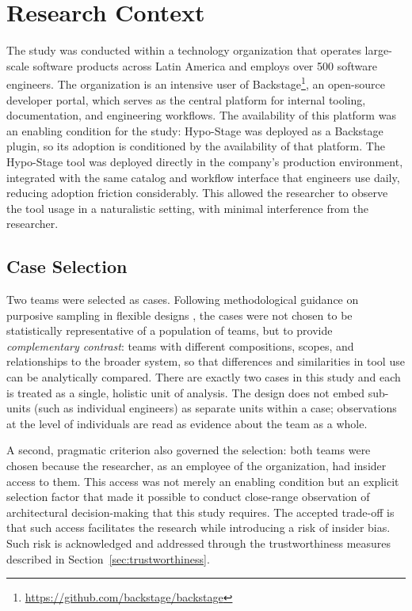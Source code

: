 \section{Research Context}
\label{sec:research-context}

The study was conducted within a technology organization that operates
large-scale software products across Latin America and employs over 500 software
engineers. The organization is an intensive user of Backstage\footnote{\url{https://github.com/backstage/backstage}}, an open-source
developer portal, which serves as the central platform for internal tooling,
documentation, and engineering workflows. The availability of this platform was an
enabling condition for the study: Hypo-Stage was deployed as a Backstage plugin, so its adoption is conditioned by the availability of that platform.
The Hypo-Stage tool was deployed directly in the company's production environment, integrated with the same catalog and workflow interface that engineers use daily, reducing adoption friction considerably. 
This allowed the researcher to observe the tool usage in a naturalistic setting, with minimal interference from the researcher.

\subsection{Case Selection}
\label{sec:case-selection}

Two teams were selected as cases. Following methodological guidance on purposive sampling in flexible designs \citep{robson2016}, the cases were not chosen
to be statistically representative of a population of teams, but to provide
\emph{complementary contrast}: teams with different compositions, scopes, and
relationships to the broader system, so that differences and similarities in tool use
can be analytically compared. There are exactly two cases in this study and each is treated as a single, holistic unit of analysis. The design
does not embed sub-units (such as individual engineers) as separate units within a
case; observations at the level of individuals are read as evidence about the team as
a whole.

A second, pragmatic criterion also governed the selection: both teams were chosen
because the researcher, as an employee of the organization, had insider access to
them. This access was not merely an enabling condition but an explicit
selection factor that made it possible to conduct close-range observation of architectural decision-making that this study requires.
The accepted trade-off is that such access facilitates the research while introducing a risk of insider bias. Such risk is acknowledged and addressed
through the trustworthiness measures described in Section~\ref{sec:trustworthiness}.

